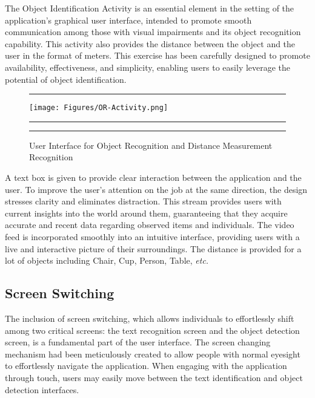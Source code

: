 \documentclass[MScCS]{uccthesis}
\begin{document}
The Object Identification Activity is an essential element in the setting of the application's graphical user interface, intended to promote smooth communication among those with visual impairments and its object recognition capability. This activity also provides the distance between the object and the user in the format of meters. This exercise has been carefully designed to promote availability, effectiveness, and simplicity, enabling users to easily leverage the potential of object identification.


\begin{figure}[H]
      \hrule
      \vspace{0.5em}
     \centering
      \texttt{[image: Figures/OR-Activity.png]}
      \vspace{0.5em}
      \hrule
      \vspace{0.5em}
      \caption{\centering\label{fig:OR-Activity}User Interface for Object Recognition and Distance Measurement Recognition }
      \vspace{0.5em}
      \hrule
   \end{figure}

A text box is given to provide clear interaction between the application and the user. To improve the user's attention on the job at the same direction, the design stresses clarity and eliminates distraction. This stream provides users with current insights into the world around them, guaranteeing that they acquire accurate and recent data regarding observed items and individuals. The video feed is incorporated smoothly into an intuitive interface, providing users with a live and interactive picture of their surroundings. The distance is provided for a lot of objects including Chair, Cup, Person, Table, \textit{etc.} 

\subsection{Screen Switching}

The inclusion of screen switching, which allows individuals to effortlessly shift among two critical screens: the text recognition screen and the object detection screen, is a fundamental part of the user interface. The screen changing mechanism had been meticulously created to allow people with normal eyesight to effortlessly navigate the application. When engaging with the application through touch, users may easily move between the text identification and object detection interfaces.
\end{document}
